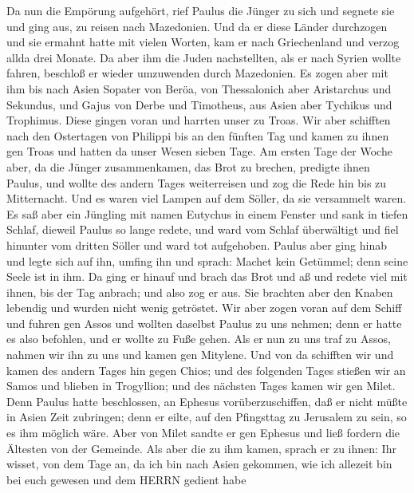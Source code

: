  Da nun die Empörung aufgehört, rief Paulus die Jünger zu
sich und segnete sie und ging aus, zu reisen nach Mazedonien.
 Und da er diese Länder durchzogen und sie ermahnt hatte mit
vielen Worten, kam er nach Griechenland und verzog allda drei Monate.
 Da aber ihm die Juden nachstellten, als er nach Syrien
wollte fahren, beschloß er wieder umzuwenden durch Mazedonien.
 Es zogen aber mit ihm bis nach Asien Sopater von Beröa, von
Thessalonich aber Aristarchus und Sekundus, und Gajus von Derbe und
Timotheus, aus Asien aber Tychikus und Trophimus.  Diese
gingen voran und harrten unser zu Troas.  Wir aber schifften
nach den Ostertagen von Philippi bis an den fünften Tag und kamen zu
ihnen gen Troas und hatten da unser Wesen sieben Tage.  Am
ersten Tage der Woche aber, da die Jünger zusammenkamen, das Brot zu
brechen, predigte ihnen Paulus, und wollte des andern Tages weiterreisen
und zog die Rede hin bis zu Mitternacht.  Und es waren viel
Lampen auf dem Söller, da sie versammelt waren.  Es saß aber
ein Jüngling mit namen Eutychus in einem Fenster und sank in tiefen
Schlaf, dieweil Paulus so lange redete, und ward vom Schlaf überwältigt
und fiel hinunter vom dritten Söller und ward tot aufgehoben.
 Paulus aber ging hinab und legte sich auf ihn, umfing ihn
und sprach: Machet kein Getümmel; denn seine Seele ist in ihm.
 Da ging er hinauf und brach das Brot und aß und redete
viel mit ihnen, bis der Tag anbrach; und also zog er aus. 
Sie brachten aber den Knaben lebendig und wurden nicht wenig getröstet.
 Wir aber zogen voran auf dem Schiff und fuhren gen Assos
und wollten daselbst Paulus zu uns nehmen; denn er hatte es also
befohlen, und er wollte zu Fuße gehen.  Als er nun zu uns
traf zu Assos, nahmen wir ihn zu uns und kamen gen Mitylene.
 Und von da schifften wir und kamen des andern Tages hin
gegen Chios; und des folgenden Tages stießen wir an Samos und blieben in
Trogyllion; und des nächsten Tages kamen wir gen Milet. 
Denn Paulus hatte beschlossen, an Ephesus vorüberzuschiffen, daß er
nicht müßte in Asien Zeit zubringen; denn er eilte, auf den Pfingsttag
zu Jerusalem zu sein, so es ihm möglich wäre.  Aber von
Milet sandte er gen Ephesus und ließ fordern die Ältesten von der
Gemeinde.  Als aber die zu ihm kamen, sprach er zu ihnen:
Ihr wisset, von dem Tage an, da ich bin nach Asien gekommen, wie ich
allezeit bin bei euch gewesen  und dem HERRN gedient habe
